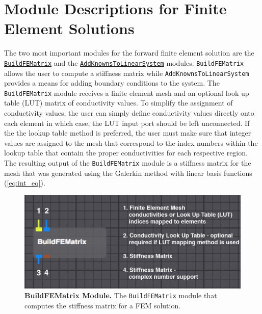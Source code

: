 \newpage

\section{Module Descriptions for Finite Element Solutions}

The two most important modules for the forward finite element solution are the \href{http://sciinstitute.github.io/scirun.pages/modules.html#BuildFEMatrix}{\tt BuildFEMatrix}
and the \href{http://sciinstitute.github.io/scirun.pages/modules.html#AddKnownsToLinearSystem}{\tt AddKnownsToLinearSystem} modules. {\tt BuildFEMatrix} allows the user to compute a stiffness matrix while {\tt AddKnownsToLinearSystem} provides a means for adding boundary conditions to the system.
The {\tt BuildFEMatrix} module receives a finite element mesh and an optional look up table (LUT) matrix of conductivity values.
To simplify the assignment of conductivity values, the user can simply define conductivity values directly onto each element in which case, the LUT input port should be left unconnected.
If the the lookup table method is preferred, the user must make sure that integer values are assigned to the mesh that correspond to the index numbers within the lookup table that contain the proper conductivities for each respective region.
The resulting output of the {\tt BuildFEMatrix} module is a stiffness matrix for the mesh that was generated using the Galerkin method with linear basis functions (\autoref{eq:int_eq}).

\begin{figure}[t]
\begin{center}
\includegraphics[width=.8\textwidth]{ECGToolkitGuide_figures/BuildFEMatrix.png}
\caption{{\bf BuildFEMatrix Module.} The {\tt BuildFEMatrix} module that computes the stiffness matrix for a FEM solution.}
\label{fig:FEM}
\end{center}
\end{figure}

